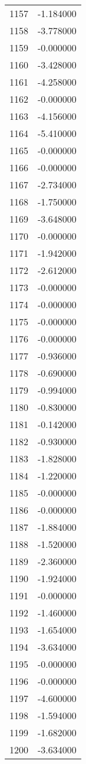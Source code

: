 \documentclass[12pt]{article}
\begin{document}
\begin{longtable}{@{}cc@{}}
1157 & -1.184000 \\
1158 & -3.778000 \\
1159 & -0.000000 \\
1160 & -3.428000 \\
1161 & -4.258000 \\
1162 & -0.000000 \\
1163 & -4.156000 \\
1164 & -5.410000 \\
1165 & -0.000000 \\
1166 & -0.000000 \\
1167 & -2.734000 \\
1168 & -1.750000 \\
1169 & -3.648000 \\
1170 & -0.000000 \\
1171 & -1.942000 \\
1172 & -2.612000 \\
1173 & -0.000000 \\
1174 & -0.000000 \\
1175 & -0.000000 \\
1176 & -0.000000 \\
1177 & -0.936000 \\
1178 & -0.690000 \\
1179 & -0.994000 \\
1180 & -0.830000 \\
1181 & -0.142000 \\
1182 & -0.930000 \\
1183 & -1.828000 \\
1184 & -1.220000 \\
1185 & -0.000000 \\
1186 & -0.000000 \\
1187 & -1.884000 \\
1188 & -1.520000 \\
1189 & -2.360000 \\
1190 & -1.924000 \\
1191 & -0.000000 \\
1192 & -1.460000 \\
1193 & -1.654000 \\
1194 & -3.634000 \\
1195 & -0.000000 \\
1196 & -0.000000 \\
1197 & -4.600000 \\
1198 & -1.594000 \\
1199 & -1.682000 \\
1200 & -3.634000 \\

\end{longtable}
\end{document}
